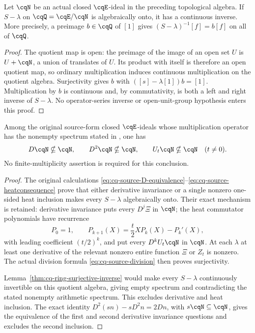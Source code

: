 \begin{cqlemma}
\label{thm:cq-ring-surjective-inverse}
Let $\cqN$ be an actual closed $\cqE$-ideal in the preceding
topological algebra. If $S-\lambda$ on $\cqQ=\cqE/\cqN$
is algebraically onto, it has a continuous inverse.
More precisely, a preimage $b\in\cqQ$ of $[1]$ gives
$(S-\lambda)^{-1}[f]=b[f]$ on all of $\cqQ$.
\end{cqlemma}
\begin{proof}
The quotient map is open: the preimage of the image of an
open set $U$ is $U+\cqN$, a union of translates of $U$.
Its product with itself is therefore an open quotient
map, so ordinary multiplication induces continuous
multiplication on the quotient algebra. Surjectivity gives
$b$ with $([s]-\lambda[1])b=[1]$. Multiplication by $b$
is continuous and, by commutativity, is both a left and
right inverse of $S-\lambda$. No operator-series inverse
or open-unit-group hypothesis enters this proof.
\end{proof}

\begin{cqproposition}
\label{thm:cq-ring-ideal-spectral-obstruction}
Among the original source-form closed $\cqE$-ideals whose
multiplication operator has the nonempty spectrum stated
in \cite[Proposition~3.6(ii)]{cqCCM}, one has
\begin{equation}
 D\cqN\nsubseteq\cqN,\qquad
 D^2\cqN\nsubseteq\cqN,\qquad
 U_t\cqN\nsubseteq\cqN\quad(t\ne0).
 \label{eq:cq-ring-ideal-obstruction}
\end{equation}
No finite-multiplicity assertion is required for this conclusion.
\end{cqproposition}
\begin{proof}
The original calculations
\eqref{eq:cq-source-D-equivalence}--\eqref{eq:cq-source-heatconsequence}
prove that either derivative invariance or a single
nonzero one-sided heat inclusion makes every $S-\lambda$
algebraically onto. Their exact mechanism is retained:
derivative invariance puts every $D^j\Xi$ in $\cqN$;
the heat commutator polynomials have recurrence
\[
 P_0=1,\qquad P_{k+1}(X)=\frac t2XP_k(X)-P_k'(X),
\]
with leading coefficient $(t/2)^k$, and put every
$D^kU_t\cqN$ in $\cqN$. At each $\lambda$ at least one
derivative of the relevant nonzero entire function
$\Xi$ or $Z_t$ is nonzero. The actual division formula
\eqref{eq:cq-source-division} then proves surjectivity.

Lemma~\ref{thm:cq-ring-surjective-inverse} would make every
$S-\lambda$ continuously invertible on this quotient
algebra, giving empty spectrum and contradicting the
stated nonempty arithmetic spectrum. This excludes
derivative and heat inclusion. The exact identity
$D^2(sn)-sD^2n=2Dn$, with $s\cqN\subseteq\cqN$,
gives the equivalence of the first and second derivative
invariance questions and excludes the second inclusion.
\end{proof}

